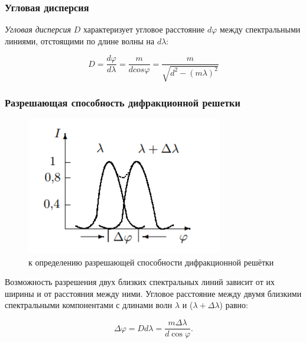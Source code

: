 \documentclass[a4paper,12pt]{article}
\begin{document}
\subsubsection*{Угловая дисперсия}

\noindent \textit{Угловая дисперсия} $D$ характеризует угловое расстояние $d \varphi$ между спектральными линиями, отстоящими по длине волны на $d \lambda$:

\begin{equation}
	D=\dfrac{d \varphi}{d \lambda}=\frac{m}{d cos \varphi}=\dfrac{m}{\sqrt{d^{2}-(m \lambda)^{2}}}
	\label{eq:dif4}
\end{equation}

\subsubsection*{Разрешающая способность дифракционной решетки}

\begin{figure}
	\includegraphics[scale = 1]{img3}
	\caption{к определению разрешающей способности дифракционной решётки}
\end{figure}

\noindent Возможность разрешения двух близких спектральных линий зависит от их ширины и от расстояния между ними. Угловое расстояние между двумя близкими спектральными компонентами с длинами волн $\lambda$ и ($\lambda + \Delta \lambda$) равно:

\begin{equation}
	\Delta \varphi =  D d \lambda = \frac{m \Delta \lambda}{d \cos{\varphi}}.
	\label{eq:dif5}
\end{equation}
\end{document}

